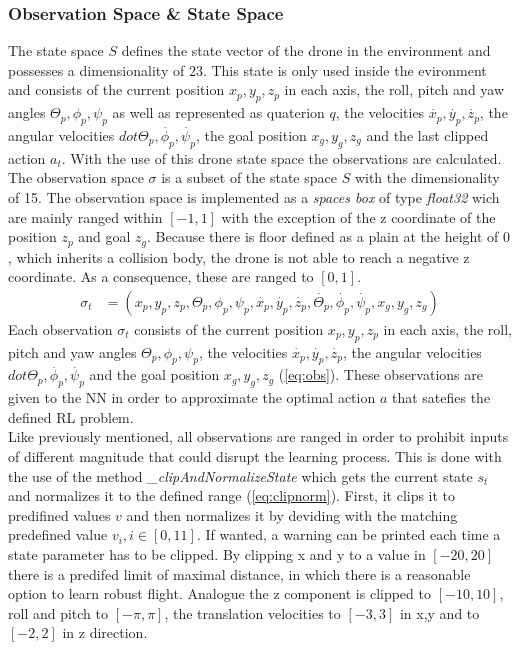 \subsubsection{Observation Space \& State Space}
The state space $S$ defines the state vector of the drone in the environment and possesses a dimensionality of $23$. This state is only used inside the evironment and consists of the current position $x_p, y_p, z_p$ in each axis, the roll, pitch and yaw angles $\Theta_p, \phi_p, \psi_p$ as well as represented as quaterion $q$, the velocities $\dot{x_p}, \dot{y_p}, \dot{z_p}$, the angular velocities $dot{\Theta_p}, \dot{\phi_p}, \dot{\psi_p}$, the goal position $x_g, y_g, z_g$ and the last clipped action $a_t$. With the use of this drone state space the observations are calculated.\\
\newline
The observation space $\sigma$ is a subset of the state space $S$ with the dimensionality of 15. The observation space is implemented as a \emph{spaces box} of type \emph{float32} wich are mainly ranged within $[-1, 1]$ with the exception of the z coordinate of the position $z_p$ and goal $z_g$. Because there is floor defined as a plain at the height of $0$, which inherits a collision body, the drone is not able to reach a negative z coordinate. As a consequence, these are ranged to $[0,1]$.
\newline
\begin{align}
	\sigma_t &= (x_p,y_p,z_p, \Theta_p, \phi_p, \psi_p, \dot{x_p}, \dot{y_p}, \dot{z_p}, \dot{\Theta_p}, \dot{\phi_p}, \dot{\psi_p}, x_g, y_g, z_g) \label{eq:obs}
\end{align}
\newline
Each observation $\sigma_t$ consists of the current position $x_p, y_p, z_p$ in each axis, the roll, pitch and yaw angles $\Theta_p, \phi_p, \psi_p$, the velocities $\dot{x_p}, \dot{y_p}, \dot{z_p}$, the angular velocities $dot{\Theta_p}, \dot{\phi_p}, \dot{\psi_p}$ and the goal position $x_g, y_g, z_g$ (\cref{eq:obs}). These observations are given to the NN in order to approximate the optimal action $a$ that satefies the defined RL problem.\\
\newline
Like previously mentioned, all observations are ranged in order to prohibit inputs of different magnitude that could disrupt the learning process. This is done with the use of the method \emph{\_clipAndNormalizeState} which gets the current state $s_t$ and normalizes it to the defined range (\cref{eq:clipnorm}). First, it clips it to predifined values $v$ and then normalizes it by deviding with the matching predefined value $v_i, i\in[0,11]$. If wanted, a warning can be printed each time a state parameter has to be clipped. By clipping x and y to a value in $[-20,20]$ there is a predifed limit of maximal distance, in which there is a reasonable option to learn robust flight. Analogue the z component is clipped to $[-10,10]$, roll and pitch to $[-\pi, \pi]$, the translation velocities to $[-3, 3]$ in x,y and to $[-2,2]$ in z direction. 
